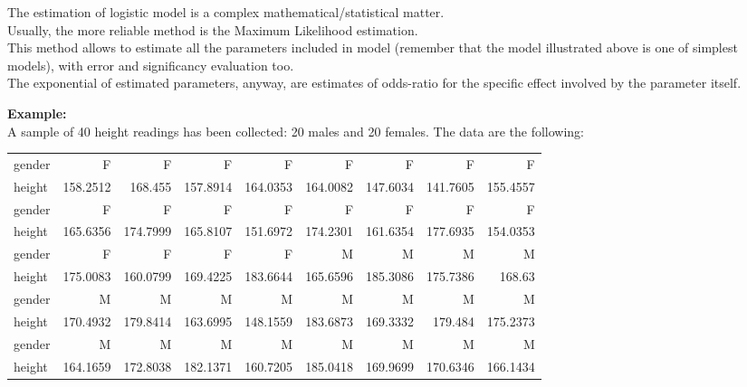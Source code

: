 \begin{frame}
  \vspace{.5cm}
  The estimation of logistic model is a complex mathematical/statistical matter.\\
  \vspace{.5cm}
  Usually, the more reliable method is the Maximum Likelihood estimation.\\
  \vspace{.5cm}
  This method allows to estimate all the parameters included in model (remember that the model illustrated above is one of simplest models), with error and significancy evaluation too.\\
  \vspace{.5cm}
  The exponential of estimated parameters, anyway, are estimates of odds-ratio for the specific effect involved by the parameter itself.
\end{frame}

\begin{frame}
 \vspace{.25cm}
 \textbf{Example:}\\
  \vspace{.25cm}
  A sample of 40 height readings has been collected: 20 males and 20 females. The data are the following:\\
  \begin{tiny}
    \begin{center}
      \begin{tabular}{l|r r r r r r r r }
        gender & F & F & F & F & F & F & F & F \\
        height & 158.2512 & 168.455 & 157.8914 & 164.0353 & 164.0082 & 147.6034 & 141.7605 & 155.4557\\
        \hline
        gender & F & F & F & F & F & F & F & F \\
        height & 165.6356 & 174.7999 & 165.8107 & 151.6972 & 174.2301 & 161.6354 & 177.6935 & 154.0353\\
        \hline
        gender & F & F & F & F & M & M & M & M \\
        height & 175.0083 & 160.0799 & 169.4225 & 183.6644 & 165.6596 & 185.3086 & 175.7386 & 168.63 \\
        \hline
        gender & M & M & M & M & M & M & M & M \\
        height & 170.4932 & 179.8414 & 163.6995 & 148.1559 & 183.6873 & 169.3332 & 179.484 & 175.2373\\
        \hline
        gender & M & M & M & M & M & M & M & M \\
        height & 164.1659 & 172.8038 & 182.1371 & 160.7205 & 185.0418 & 169.9699 & 170.6346 & 166.1434\\
      \end{tabular}
    \end{center}
  \end{tiny}
\end{frame}

